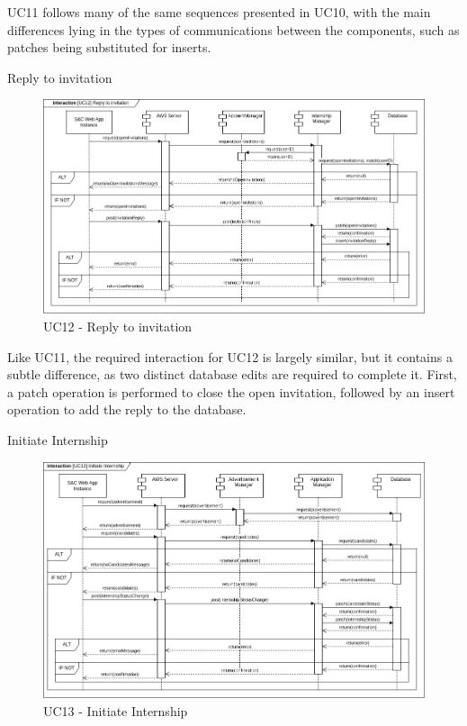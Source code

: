 \begin{enumerate}[label={[UC\arabic*]}]
    UC11 follows many of the same sequences presented in UC10, with the main differences lying in the types of communications between the components, such as patches being substituted for inserts.

    \item Reply to invitation

    \begin{figure}[h]
        \centering
        \includegraphics[width=0.90\linewidth]{DD-Latex//assets//Runtime View Diagrams/UC12.jpg}
        \caption{UC12 - Reply to invitation}
        \label{fig:UC12}
    \end{figure}

    Like UC11, the required interaction for UC12 is largely similar, but it contains a subtle difference, as two distinct database edits are required to complete it. First, a patch operation is performed to close the open invitation, followed by an insert operation to add the reply to the database.
    
    \item Initiate Internship
    \begin{figure}[h]
        \centering
        \includegraphics[width=1\linewidth]{DD-Latex//assets//Runtime View Diagrams/UC13.jpg}
        \caption{UC13 - Initiate Internship}
        \label{fig:UC13}
    \end{figure}


\end{enumerate}
